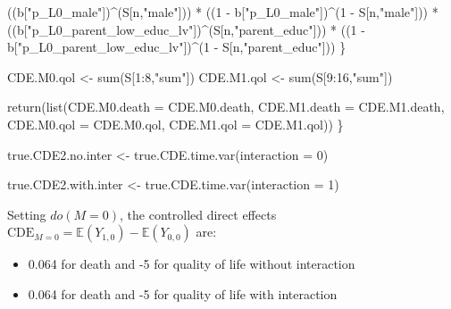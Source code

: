\documentclass[
]{book}
\newenvironment{Shaded}{\begin{snugshade}}{\end{snugshade}}
\newcommand{\AttributeTok}[1]{\textcolor[rgb]{0.77,0.63,0.00}{#1}}
\newcommand{\DecValTok}[1]{\textcolor[rgb]{0.00,0.00,0.81}{#1}}
\newcommand{\FunctionTok}[1]{\textcolor[rgb]{0.00,0.00,0.00}{#1}}
\newcommand{\NormalTok}[1]{#1}
\newcommand{\OtherTok}[1]{\textcolor[rgb]{0.56,0.35,0.01}{#1}}
\newcommand{\SpecialCharTok}[1]{\textcolor[rgb]{0.00,0.00,0.00}{#1}}
\newcommand{\StringTok}[1]{\textcolor[rgb]{0.31,0.60,0.02}{#1}}
\providecommand{\tightlist}{%
  \setlength{\itemsep}{0pt}\setlength{\parskip}{0pt}}
\begin{document}
\begin{Shaded}
\begin{Highlighting}[]
\NormalTok{      ((b[}\StringTok{"p\_L0\_male"}\NormalTok{])}\SpecialCharTok{\^{}}\NormalTok{(S[n,}\StringTok{"male"}\NormalTok{])) }\SpecialCharTok{*} 
\NormalTok{      ((}\DecValTok{1} \SpecialCharTok{{-}}\NormalTok{ b[}\StringTok{"p\_L0\_male"}\NormalTok{])}\SpecialCharTok{\^{}}\NormalTok{(}\DecValTok{1} \SpecialCharTok{{-}}\NormalTok{ S[n,}\StringTok{"male"}\NormalTok{])) }\SpecialCharTok{*} 
\NormalTok{      ((b[}\StringTok{"p\_L0\_parent\_low\_educ\_lv"}\NormalTok{])}\SpecialCharTok{\^{}}\NormalTok{(S[n,}\StringTok{"parent\_educ"}\NormalTok{])) }\SpecialCharTok{*}
\NormalTok{      ((}\DecValTok{1} \SpecialCharTok{{-}}\NormalTok{ b[}\StringTok{"p\_L0\_parent\_low\_educ\_lv"}\NormalTok{])}\SpecialCharTok{\^{}}\NormalTok{(}\DecValTok{1} \SpecialCharTok{{-}}\NormalTok{ S[n,}\StringTok{"parent\_educ"}\NormalTok{])) }
\NormalTok{    \}}
  
\NormalTok{  CDE.M0.qol }\OtherTok{\textless{}{-}} \FunctionTok{sum}\NormalTok{(S[}\DecValTok{1}\SpecialCharTok{:}\DecValTok{8}\NormalTok{,}\StringTok{"sum"}\NormalTok{])}
\NormalTok{  CDE.M1.qol }\OtherTok{\textless{}{-}} \FunctionTok{sum}\NormalTok{(S[}\DecValTok{9}\SpecialCharTok{:}\DecValTok{16}\NormalTok{,}\StringTok{"sum"}\NormalTok{])}
  
  \FunctionTok{return}\NormalTok{(}\FunctionTok{list}\NormalTok{(}\AttributeTok{CDE.M0.death =}\NormalTok{ CDE.M0.death, }\AttributeTok{CDE.M1.death =}\NormalTok{ CDE.M1.death, }
              \AttributeTok{CDE.M0.qol =}\NormalTok{ CDE.M0.qol, }\AttributeTok{CDE.M1.qol =}\NormalTok{ CDE.M1.qol))}
\NormalTok{\}}
\end{Highlighting}
\end{Shaded}

\begin{Shaded}
\begin{Highlighting}[]
\NormalTok{true.CDE2.no.inter }\OtherTok{\textless{}{-}} \FunctionTok{true.CDE.time.var}\NormalTok{(}\AttributeTok{interaction =} \DecValTok{0}\NormalTok{)}

\NormalTok{true.CDE2.with.inter }\OtherTok{\textless{}{-}} \FunctionTok{true.CDE.time.var}\NormalTok{(}\AttributeTok{interaction =} \DecValTok{1}\NormalTok{)}
\end{Highlighting}
\end{Shaded}

Setting \(do(M=0)\), the controlled direct effects \(\text{CDE}_{M=0} = \mathbb{E}\left(Y_{1,0} \right) - \mathbb{E}\left(Y_{0,0} \right)\) are:

\begin{itemize}
\tightlist
\item
  0.064 for death and -5 for quality of life without interaction
\item
  0.064 for death and -5 for quality of life with interaction
\end{itemize}
\end{document}
